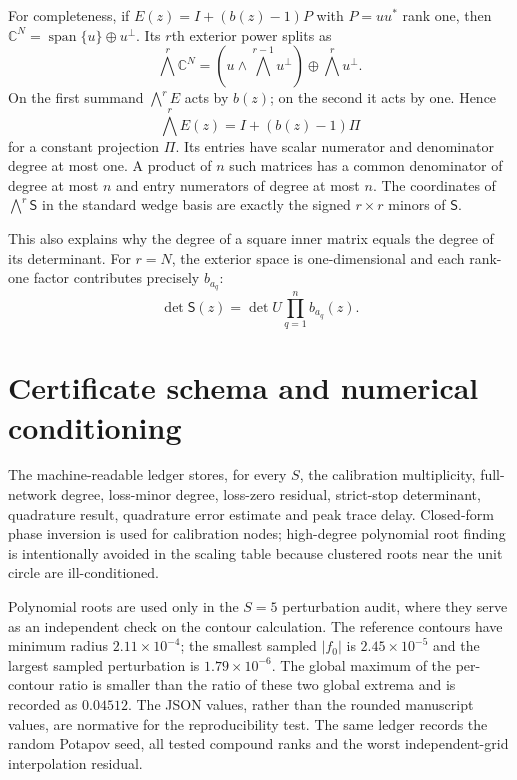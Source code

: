 \documentclass[11pt]{article}
\theoremstyle{definition}
\theoremstyle{remark}
\newcommand{\C}{\mathbb{C}}
\begin{document}
For completeness, if $E(z)=I+(b(z)-1)P$ with $P=uu^*$ rank one, then
$\C^N=\operatorname{span}\{u\}\oplus u^\perp$.  Its $r$th exterior power
splits as
\[
 \bigwedge^r\C^N=
 \left(u\wedge\bigwedge^{r-1}u^\perp\right)
 \oplus \bigwedge^r u^\perp.
\]
On the first summand $\bigwedge^rE$ acts by $b(z)$; on the second it acts by
one.  Hence
\[
 \bigwedge^rE(z)=I+(b(z)-1)\Pi
\]
for a constant projection $\Pi$.  Its entries have scalar numerator and
denominator degree at most one.  A product of $n$ such matrices has a common
denominator of degree at most $n$ and entry numerators of degree at most $n$.
The coordinates of $\bigwedge^r\mathsf S$ in the standard wedge basis are
exactly the signed $r\times r$ minors of $\mathsf S$.

This also explains why the degree of a square inner matrix equals the degree
of its determinant.  For $r=N$, the exterior space is one-dimensional and
each rank-one factor contributes precisely $b_{a_q}$:
\[
 \det\mathsf S(z)=\det U\prod_{q=1}^{n}b_{a_q}(z).
\]

\section{Certificate schema and numerical conditioning}

The machine-readable ledger stores, for every $S$, the calibration
multiplicity, full-network degree, loss-minor degree, loss-zero residual,
strict-stop determinant, quadrature result, quadrature error estimate and
peak trace delay.  Closed-form phase inversion is used for calibration nodes;
high-degree polynomial root finding is intentionally avoided in the scaling
table because clustered roots near the unit circle are ill-conditioned.

Polynomial roots are used only in the $S=5$ perturbation audit, where they
serve as an independent check on the contour calculation.  The reference
contours have minimum radius $2.11\times10^{-4}$; the smallest sampled
$|f_0|$ is $2.45\times10^{-5}$ and the largest sampled perturbation is
$1.79\times10^{-6}$.  The global maximum of the per-contour ratio is smaller
than the ratio of these two global extrema and is recorded as $0.04512$.
The JSON values, rather than the rounded manuscript values, are normative for
the reproducibility test.
The same ledger records the random Potapov seed, all tested compound ranks and
the worst independent-grid interpolation residual.



\end{document}
